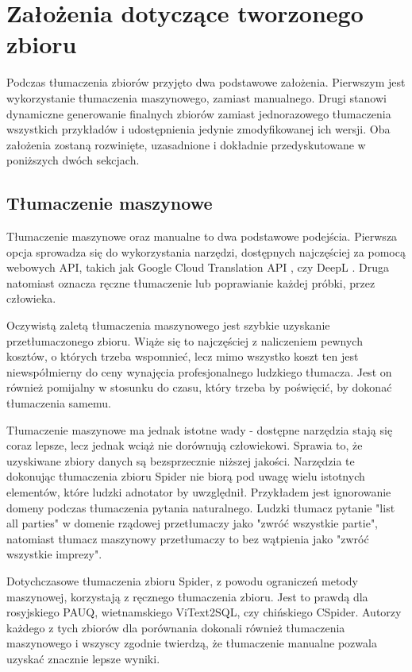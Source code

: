 \section{Założenia dotyczące tworzonego zbioru}
Podczas tłumaczenia zbiorów przyjęto dwa podstawowe założenia. Pierwszym jest wykorzystanie tłumaczenia maszynowego, zamiast manualnego. Drugi stanowi dynamiczne generowanie finalnych zbiorów zamiast jednorazowego tłumaczenia wszystkich przykładów i udostępnienia jedynie zmodyfikowanej ich wersji. Oba założenia zostaną rozwinięte, uzasadnione i dokładnie przedyskutowane w poniższych dwóch sekcjach.

\subsection{Tłumaczenie maszynowe}
Tłumaczenie maszynowe oraz manualne to dwa podstawowe podejścia. Pierwsza opcja sprowadza się do wykorzystania narzędzi, dostępnych najczęściej za pomocą webowych API, takich jak Google Cloud Translation API \cite{google-translation-api}, czy DeepL \cite{deepl}. Druga natomiast oznacza ręczne tłumaczenie lub poprawianie każdej próbki, przez człowieka.

Oczywistą zaletą tłumaczenia maszynowego jest szybkie uzyskanie przetłumaczonego zbioru. Wiąże się to najczęściej z naliczeniem pewnych kosztów, o których trzeba wspomnieć, lecz mimo wszystko koszt ten jest niewspółmierny do ceny wynajęcia profesjonalnego ludzkiego tłumacza. Jest on również pomijalny w stosunku do czasu, który trzeba by poświęcić, by dokonać tłumaczenia samemu.

Tłumaczenie maszynowe ma jednak istotne wady - dostępne narzędzia stają się coraz lepsze, lecz jednak wciąż nie dorównują człowiekowi. Sprawia to, że uzyskiwane zbiory danych są bezsprzecznie niższej jakości. Narzędzia te dokonując tłumaczenia zbioru Spider nie biorą pod uwagę wielu istotnych elementów, które ludzki adnotator by uwzględnił. Przykładem jest ignorowanie domeny podczas tłumaczenia pytania naturalnego. Ludzki tłumacz pytanie "list all parties" w domenie rządowej przetłumaczy jako "zwróć wszystkie partie", natomiast tłumacz maszynowy przetłumaczy to bez wątpienia jako "zwróć wszystkie imprezy".

Dotychczasowe tłumaczenia zbioru Spider, z powodu ograniczeń metody maszynowej, korzystają z ręcznego tłumaczenia zbioru. Jest to prawdą dla rosyjskiego PAUQ, wietnamskiego ViText2SQL, czy chińskiego CSpider. Autorzy każdego z tych zbiorów dla porównania dokonali również tłumaczenia maszynowego i wszyscy zgodnie twierdzą, że tłumaczenie manualne pozwala uzyskać znacznie lepsze wyniki.

